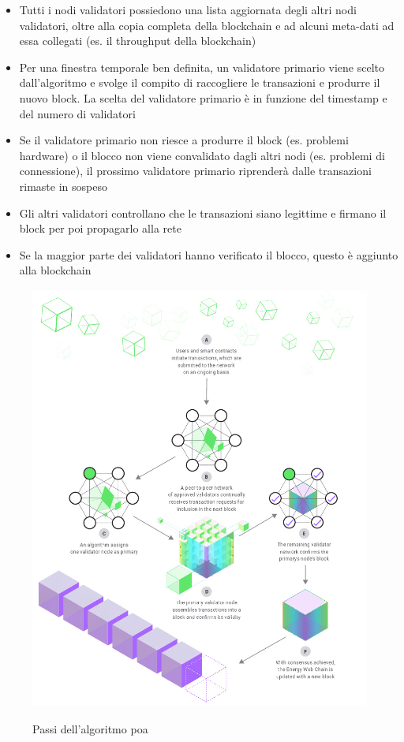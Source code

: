 \documentclass[12pt, letterpaper, twoside]{article}
\begin{document}
\begin{itemize}
    \item Tutti i nodi validatori possiedono una lista aggiornata degli altri nodi validatori, oltre alla copia completa della blockchain e ad alcuni meta-dati ad essa collegati (es. il throughput della blockchain)
    \item Per una finestra temporale ben definita, un validatore primario viene scelto dall'algoritmo e svolge il compito di raccogliere le transazioni e produrre il nuovo block. La scelta del validatore primario è in funzione del timestamp e del numero di validatori
    \item Se il validatore primario non riesce a produrre il block (es. problemi hardware) o il blocco non viene convalidato dagli altri nodi (es. problemi di connessione), il prossimo validatore primario riprenderà dalle transazioni rimaste in sospeso
    \item Gli altri validatori controllano che le transazioni siano legittime e firmano il block per poi propagarlo alla rete
    \item Se la maggior parte dei validatori hanno verificato il blocco, questo è aggiunto alla blockchain
\end{itemize}

\newpage

\begin{figure}[!h]
    \includegraphics[height=14cm,keepaspectratio]{ew-poa}
    \centering
    \label{ew-poa}
    \caption{Passi dell'algoritmo \gls{poa} \cite{img:ew-poa}}
\end{figure}
\end{document}
